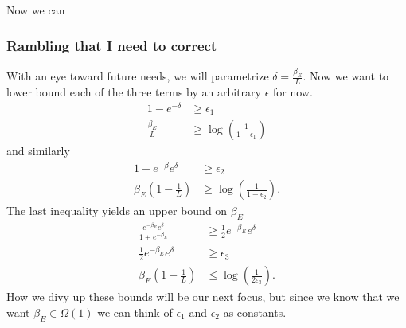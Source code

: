 \documentclass{article}
\newcommand{\parens}[1]{\left( #1 \right)}
\begin{document}
Now we can 



\subsubsection{Rambling that I need to correct}
With an eye toward future needs, we will parametrize $\delta = \frac{\beta_E}{L}$. Now we want to lower bound each of the three terms by an arbitrary $\epsilon$ for now.
\begin{align}
    1 - e^{-\delta} &\geq \epsilon_1 \\
    \frac{\beta_E}{L} &\geq \log \left( \frac{1}{1 - \epsilon_1} \right)
\end{align}
and similarly
\begin{align}
    1 - e^{-\beta} e^{\delta} &\geq \epsilon_2 \\
    \beta_E \left( 1 - \frac{1}{L} \right) &\geq \log \parens{\frac{1}{1 - \epsilon_2}}.
\end{align}
The last inequality yields an upper bound on $\beta_E$
\begin{align}
    \frac{e^{-\beta_E} e^{\delta}}{1 + e^{-\beta_E}} &\geq \frac{1}{2} e^{-\beta_E} e^{\delta} \\
    \frac{1}{2} e^{-\beta_E} e^{\delta} &\geq \epsilon_3 \\
    \beta_E \parens{1 - \frac{1}{L}} &\leq \log \parens{\frac{1}{2 \epsilon_3}}.
\end{align}
How we divy up these bounds will be our next focus, but since we know that we want $\beta_E \in \Omega(1)$ we can think of $\epsilon_1$ and $\epsilon_2$ as constants.
\end{document}
